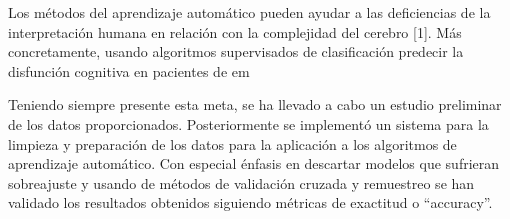 Los métodos del aprendizaje automático pueden ayudar a las deficiencias de la interpretación humana en relación con la complejidad del cerebro [1]. Más concretamente, usando algoritmos supervisados de clasificación predecir la disfunción cognitiva en pacientes de \gls{em}

Teniendo siempre presente esta meta, se ha llevado a cabo un estudio preliminar de los datos proporcionados. Posteriormente se implementó un sistema para la limpieza y preparación de los datos para la aplicación a los algoritmos de aprendizaje automático. Con especial énfasis en descartar modelos que sufrieran sobreajuste y usando de métodos de validación cruzada y remuestreo se han validado los resultados obtenidos siguiendo métricas de exactitud o ``accuracy''.